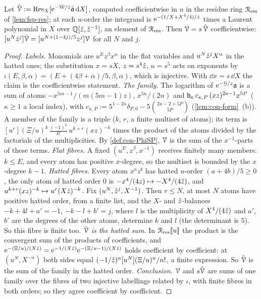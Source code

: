\begin{lem}
\label{lem:con-relab}
Let $\hat{\mathcal{V}}:=\operatorname*{Res}_X[\mathrm{e}^{-\hat{\mathcal{W}}/\hat{z}}\hat{\mathfrak{a}}\,\mathrm{d} X]$, computed coefficientwise in $u$ in the residue ring $\mathcal{R}_{\mathrm{res}}$ of \cref{lem:fsp-res}; at each $u$-order the integrand is $\mathrm{e}^{-(1/X+X^4/4)/\hat{z}}$ times a Laurent polynomial in $X$ over $\mathbb{Q}[\hat{z},\hat{z}^{-1}]$, an element of $\mathcal{R}_{\mathrm{res}}$. Then $\mathcal{V}=s\,\hat{\mathcal{V}}$ coefficientwise: $[u^N\hat{z}^j]\hat{\mathcal{V}}=[u^{N+(1-4j)/5}z^j]\mathcal{V}$ for all $N$ and $j$.
\end{lem}

\begin{proof}
\emph{Labels.} Monomials are $u^Ez^\beta x^\alpha$ in the flat variables and $u^N\hat{z}^jX^\alpha$ in the hatted ones; the substitution $x=sX$, $z=s^4\hat{z}$, $u=s^5$ acts on exponents by $\iota(E,\beta,\alpha)=(E+(4\beta+\alpha)/5,\beta,\alpha)$, which is injective. With $\dd x=s\,\dd X$ the claim is the coefficientwise statement.
\emph{The family.} The logarithm of $\mathrm{e}^{-\mathcal{G}/z}\mathfrak{a}$ is a sum of atoms $-x^{5m-1}/(m(5m-1)z)$, $x^{5n}/(2n)$ and $\mathsf{b}_\kappa\,c_{\kappa,P}\,(xz)^{2\kappa-1}x^{5P}$ ($\kappa\geq1$ a local index), with $c_{\kappa,P}:=5^{1-2\kappa}\delta_{P,0}-5\binom{2\kappa-2+5P}{5P}$ (\cref{lem:con-form}~(b)). A member of the family is a triple ($k$, $r$, a finite multiset of atoms); its term is $[u^r](\Xi/u)^k\,\frac{(-1)^k}{k!}\,u^{k+r}(xz)^{-k}$ times the product of the atoms divided by the factorials of the multiplicities. By \cref{def:con-PhiSP}, $\mathcal{V}$ is the sum of the $x^{-1}$-parts of these terms.
\emph{Flat fibres.} A fixed $(u^E,z^\beta,x^{-1})$ receives finitely many members: $k\leq E$, and every atom has positive $x$-degree, so the multiset is bounded by the $x$-degree $k-1$.
\emph{Hatted fibres.} Every atom $x^az^b$ has hatted $u$-order $(a+4b)/5\geq0$, the only atom of hatted order $0$ is $-x^4/(4z)\mapsto-X^4/(4\hat{z})$, and $u^{k+r}(xz)^{-k}\mapsto u^r(X\hat{z})^{-k}$. Fix $(u^N,\hat{z}^j,X^{-1})$. Then $r\leq N$, at most $N$ atoms have positive hatted order, from a finite list, and the $X$- and $\hat{z}$-balances $-k+4l+a'=-1$, $-k-l+b'=j$, where $l$ is the multiplicity of $X^4/(4\hat{z})$ and $a'$, $b'$ are the degrees of the other atoms, determine $k$ and $l$ (the determinant is $5$). So this fibre is finite too.
\emph{$\hat{\mathcal{V}}$ is the hatted sum.} In $\mathcal{R}_{\mathrm{res}}[\![ u ]\!]$ the product is the convergent sum of the products of coefficients, and $\mathrm{e}^{-(\Xi/u)/(X\hat{z})}=\mathrm{e}^{-1/(X\hat{z})}\mathrm{e}^{-(\Xi/u-1)/(X\hat{z})}$ holds coefficient by coefficient: at $(u^N,X^{-n})$ both sides equal $(-1/\hat{z})^n[u^N](\Xi/u)^n/n!$, a finite expression. So $\hat{\mathcal{V}}$ is the sum of the family in the hatted order.
\emph{Conclusion.} $\mathcal{V}$ and $s\hat{\mathcal{V}}$ are sums of one family over the fibres of two injective labellings related by $\iota$, with finite fibres in both orders; so they agree coefficient by coefficient.
\end{proof}


